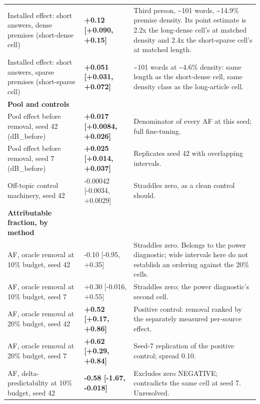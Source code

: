 \documentclass[10pt]{article}
\begin{document}
{\begin{longtable}{ p{3.52cm}lp{8.16cm} }
Installed effect: short answers, dense premises (short-dense cell) & \textbf{ +0.12 [+0.090, +0.15] } & Third person, \textasciitilde{}101 words, \textasciitilde{}14.9\% premise density. Its point estimate is 2.2x the long-dense cell's at matched density and 2.4x the short-sparse cell's at matched length. \\

Installed effect: short answers, sparse premises (short-sparse cell) & \textbf{ +0.051 [+0.031, +0.072] } & \textasciitilde{}101 words at \textasciitilde{}4.6\% density: same length as the short-dense cell, same density class as the long-article cell. \\

\textbf{ Pool and controls } &  &  \\

Pool effect before removal, seed 42 (dB\_before) & \textbf{ +0.017 [+0.0084, +0.026] } & Denominator of every AF at this seed; full fine-tuning. \\

Pool effect before removal, seed 7 (dB\_before) & \textbf{ +0.025 [+0.014, +0.037] } & Replicates seed 42 with overlapping intervals. \\

Off-topic control machinery, seed 42 & -0.00042 [-0.0034, +0.0029] & Straddles zero, as a clean control should. \\

\textbf{ Attributable fraction, by method } &  &  \\

AF, oracle removal at 10\% budget, seed 42 & -0.10 [-0.95, +0.35] & Straddles zero. Belongs to the power diagnostic; wide intervals here do not establish an ordering against the 20\% cells. \\

AF, oracle removal at 10\% budget, seed 7 & +0.30 [-0.016, +0.55] & Straddles zero; the power diagnostic's second cell. \\

AF, oracle removal at 20\% budget, seed 42 & \textbf{ +0.52 [+0.17, +0.86] } & Positive control: removal ranked by the separately measured per-source effect. \\

AF, oracle removal at 20\% budget, seed 7 & \textbf{ +0.62 [+0.29, +0.84] } & Seed-7 replication of the positive control; spread 0.10. \\

AF, delta-predictability at 10\% budget, seed 42 & \textbf{ -0.58 [-1.67, -0.018] } & Excludes zero NEGATIVE; contradicts the same cell at seed 7. Unresolved. \\


\end{longtable}}
\end{document}
